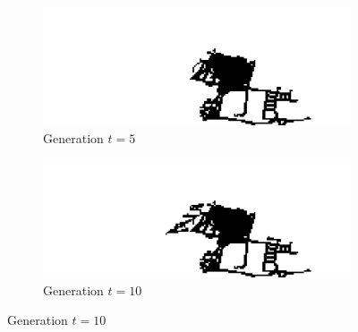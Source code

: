 \begin{figure}[H]
\begin{multicols}{2}
\begin{subfigure}{.5\textwidth}
  \centering
  \includegraphics[width=1\linewidth]{Figures/Chapter4/generation-5-melusi}
  \caption{Generation $t = 5$}
\end{subfigure}
\begin{subfigure}{.5\textwidth}
  \centering
  \includegraphics[width=1\linewidth]{Figures/Chapter4/generation-10-melusi}
  \caption{Generation $t = 10$}
\end{subfigure}
\end{multicols}


\end{figure}
